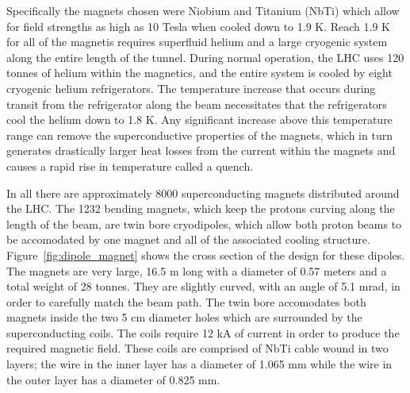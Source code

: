 Specifically the magnets chosen were Niobium and Titanium (NbTi) which allow for field strengths as high as 10 Tesla when cooled down to 1.9 K.
Reach 1.9 K for all of the magnetis requires superfluid helium and a large cryogenic system along the entire length of the tunnel.
During normal operation, the \ac{LHC} uses 120 tonnes of helium within the magnetics, and the entire system is cooled by eight cryogenic helium refrigerators.
The temperature increase that occurs during transit from the refrigerator along the beam necessitates that the refrigerators cool the helium down to 1.8 K.
Any significant increase above this temperature range can remove the superconductive properties of the magnets, which in turn generates drastically larger heat losses from the current within the magnets and causes a rapid rise in temperature called a quench.

In all there are approximately 8000 superconducting magnets distributed around the \ac{LHC}.
The 1232 bending magnets, which keep the protons curving along the length of the beam, are twin bore cryodipoles, which allow both proton beams to be accomodated by one magnet and all of the associated cooling structure.
Figure~\ref{fig:dipole_magnet} shows the cross section of the design for these dipoles. 
The magnets are very large, 16.5 m long with a diameter of 0.57 meters and a total weight of 28 tonnes. 
They are slightly curved, with an angle of 5.1 mrad, in order to carefully match the beam path.
The twin bore accomodates both magnets inside the two 5 cm diameter holes which are surrounded by the superconducting coils.
The coils require 12 kA of current in order to produce the required magnetic field.
These coils are comprised of NbTi cable wound in two layers; the wire in the inner layer has a diameter of 1.065 mm while the wire in the outer layer has a diameter of 0.825 mm. 

